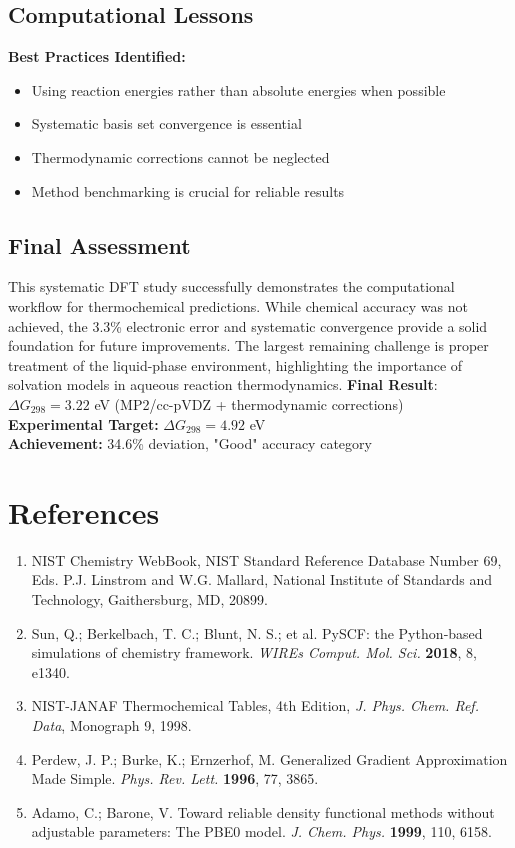 \documentclass{template}
\begin{document}
\subsection{Computational Lessons}

\textbf{Best Practices Identified:}
\begin{itemize}
\item Using reaction energies rather than absolute energies when possible
\item Systematic basis set convergence is essential
\item Thermodynamic corrections cannot be neglected
\item Method benchmarking is crucial for reliable results
\end{itemize}

\subsection{Final Assessment}

This systematic DFT study successfully demonstrates the computational workflow for thermochemical predictions. While chemical accuracy was not achieved, the 3.3\% electronic error and systematic convergence provide a solid foundation for future improvements. The largest remaining challenge is proper treatment of the liquid-phase environment, highlighting the importance of solvation models in aqueous reaction thermodynamics.
\textbf{Final Result}: $\Delta G_{298} = 3.22$ eV (MP2/cc-pVDZ + thermodynamic corrections)\\
\textbf{Experimental Target:} $\Delta G_{298} = 4.92$ eV\\
\textbf{Achievement:} 34.6\% deviation, "Good" accuracy category


\section{References}
\begin{enumerate}
\item NIST Chemistry WebBook, NIST Standard Reference Database Number 69, Eds. P.J. Linstrom and W.G. Mallard, National Institute of Standards and Technology, Gaithersburg, MD, 20899.

\item Sun, Q.; Berkelbach, T. C.; Blunt, N. S.; et al. PySCF: the Python‐based simulations of chemistry framework. \textit{WIREs Comput. Mol. Sci.} \textbf{2018}, 8, e1340.

\item NIST-JANAF Thermochemical Tables, 4th Edition, \textit{J. Phys. Chem. Ref. Data}, Monograph 9, 1998.

\item Perdew, J. P.; Burke, K.; Ernzerhof, M. Generalized Gradient Approximation Made Simple. \textit{Phys. Rev. Lett.} \textbf{1996}, 77, 3865.

\item Adamo, C.; Barone, V. Toward reliable density functional methods without adjustable parameters: The PBE0 model. \textit{J. Chem. Phys.} \textbf{1999}, 110, 6158.
\end{enumerate}
\end{document}
